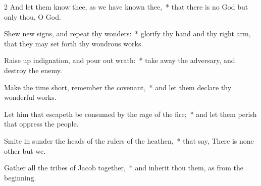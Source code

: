 \begin{multicols}{2}
And let them know thee, as we have known thee,~* that there is no God but only thou, O God.\par
Shew new signs, and repeat thy wonders:~* glorify thy hand and thy right arm, that they may set forth thy wondrous works.\par
Raise up indignation, and pour out wrath:~* take away the adversary, and destroy the enemy.\par
Make the time short, remember the covenant,~* and let them declare thy wonderful works.\par
Let him that escapeth be consumed by the rage of the fire;~* and let them perish that oppress the people.\par
Smite in sunder the heads of the rulers of the heathen,~* that say, There is none other but we.\par
Gather all the tribes of Jacob together,~* and inherit thou them, as from the beginning.
\end{multicols}

\clearpage